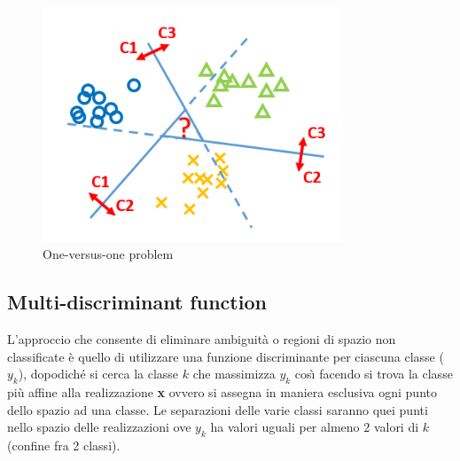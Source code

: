 \begin{figure}[h]
	\centering
	\includegraphics[width=0.8\textwidth]{Immagini/OVO}
	\caption{One-versus-one problem
		\label{Fig:One-versus-one problem}}
\end{figure}

\subsection{Multi-discriminant function}
L'approccio che consente di eliminare ambiguit\`{a} o regioni di spazio non classificate \`{e} quello di utilizzare una funzione discriminante per ciascuna classe ($y_k$), dopodich\'{e} si cerca la classe $k$ che massimizza $y_k$ cos\`{\i} facendo si trova la classe pi\`{u} affine alla realizzazione \textbf{x} ovvero si assegna in maniera esclusiva ogni punto dello spazio ad una classe. Le separazioni delle varie classi saranno quei punti nello spazio delle realizzazioni ove $y_k$ ha valori uguali per almeno 2 valori di $k$ (confine fra 2 classi).

